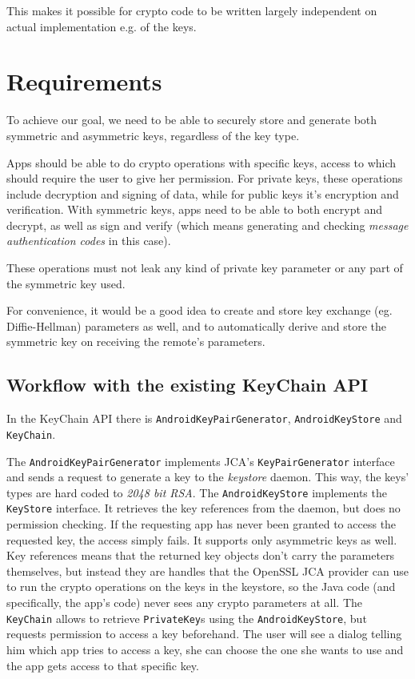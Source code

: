 \documentclass[a4paper,draft]{scrartcl}
\begin{document}
		This makes it possible for crypto code to be written largely independent on actual implementation e.g. of the keys.

	\section{Requirements}
		To achieve our goal, we need to be able to securely store and generate both symmetric and asymmetric keys, regardless of the key type.

		Apps should be able to do crypto operations with specific keys, access to which should require the user	to give her permission. For private keys, these operations include decryption and signing of data, while for public keys it's encryption and verification. With symmetric keys, apps need to be able to both encrypt and decrypt, as well as sign and verify (which means generating and checking {\em message authentication codes} in this case).

		These operations must not leak any kind of private key parameter or any part of the symmetric key used.

		For convenience, it would be a good idea to create and store key exchange (eg. Diffie-Hellman) parameters as well, and to automatically derive and store the symmetric key on receiving the remote's parameters.

	\subsection{Workflow with the existing KeyChain API}
		In the KeyChain API there is \texttt{AndroidKeyPairGenerator}, \texttt{AndroidKeyStore} and \linebreak \texttt{KeyChain}.

		The \texttt{AndroidKeyPairGenerator} implements JCA's \texttt{KeyPairGenerator} interface and sends a request to generate a key to the {\em keystore} daemon. This way, the keys' types are hard coded to {\em 2048 bit RSA}. The \texttt{AndroidKeyStore} implements the \texttt{KeyStore} interface. It retrieves the key references from the daemon, but does no permission checking. If the requesting app has never been granted to access the requested key, the access simply fails. It supports only asymmetric keys as well.
		Key references means that the returned key objects don't carry the parameters themselves, but instead they are	handles that the OpenSSL JCA provider can use to run the crypto operations on the keys in the keystore, so the Java code (and specifically, the app's code) never sees any crypto parameters at all. The \texttt{KeyChain} allows to retrieve \texttt{PrivateKey}s using the \texttt{AndroidKeyStore}, but requests permission to access a key beforehand. The user will see a dialog telling him which app tries to access a key, she can choose the one she wants to use and the app gets access to that specific key. 
		
\end{document}
